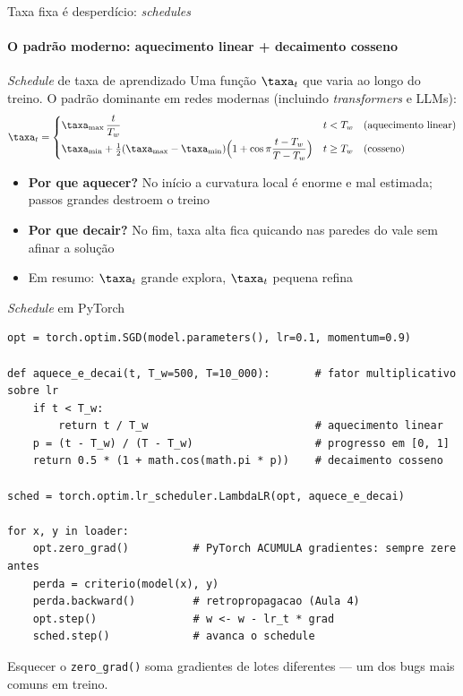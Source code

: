 \documentclass[aspectratio=169, 11pt]{beamer}
\begin{document}
\begin{frame}{Taxa fixa é desperdício: \emph{schedules}}
  \framesubtitle{O padrão moderno: aquecimento linear + decaimento cosseno}

  \begin{defbox}{\emph{Schedule} de taxa de aprendizado}
    Uma função \(\taxa_t\) que varia ao longo do treino. O padrão dominante em
    redes modernas (incluindo \emph{transformers} e LLMs):
    {\small\[
      \taxa_t =
      \begin{cases}
        \taxa_{\max}\, \dfrac{t}{T_w} & t < T_w \quad \text{(aquecimento linear)}\\[1.2ex]
        \taxa_{\min} + \tfrac{1}{2}(\taxa_{\max}-\taxa_{\min})
          \Bigl(1 + \cos \pi \dfrac{t - T_w}{T - T_w}\Bigr) & t \ge T_w
          \quad \text{(cosseno)}
      \end{cases}
    \]}
  \end{defbox}

  \begin{itemize}\setlength{\itemsep}{0.3ex}
    \item \textbf{Por que aquecer?} No início a curvatura local é enorme e mal
          estimada; passos grandes destroem o treino
    \item \textbf{Por que decair?} No fim, taxa alta fica quicando nas paredes
          do vale sem afinar a solução
    \item Em resumo: \(\taxa_t\) grande explora, \(\taxa_t\) pequena refina
  \end{itemize}
\end{frame}

\begin{frame}[fragile]{\emph{Schedule} em PyTorch}
  \begin{lstlisting}
opt = torch.optim.SGD(model.parameters(), lr=0.1, momentum=0.9)

def aquece_e_decai(t, T_w=500, T=10_000):       # fator multiplicativo sobre lr
    if t < T_w:
        return t / T_w                          # aquecimento linear
    p = (t - T_w) / (T - T_w)                   # progresso em [0, 1]
    return 0.5 * (1 + math.cos(math.pi * p))    # decaimento cosseno

sched = torch.optim.lr_scheduler.LambdaLR(opt, aquece_e_decai)

for x, y in loader:
    opt.zero_grad()          # PyTorch ACUMULA gradientes: sempre zere antes
    perda = criterio(model(x), y)
    perda.backward()         # retropropagacao (Aula 4)
    opt.step()               # w <- w - lr_t * grad
    sched.step()             # avanca o schedule
  \end{lstlisting}

  \smallskip
  Esquecer o \texttt{zero\_grad()} soma gradientes de lotes diferentes — um dos
  bugs mais comuns em treino.
\end{frame}
\end{document}
